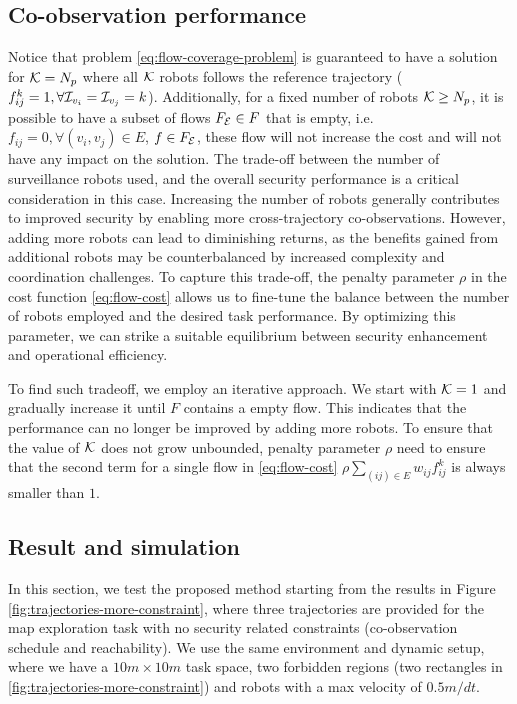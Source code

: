 \documentclass[journal]{IEEEtran}  %
\begin{document}
\subsection{Co-observation performance}
Notice that problem \eqref{eq:flow-coverage-problem} is guaranteed to have a solution for $\mathcal{K}=N_{p}$ where all $\mathcal{K}$ robots follows the reference trajectory ($f^{k}_{ij}=1, \forall \mathcal{I}_{v_{i}}=\mathcal{I}_{v_{j}}=k$).  Additionally, for a fixed number of robots $\mathcal{K} \geq N_{p}$, it is possible to have a subset of flows $F_{\mathcal{E}} \in F$ that is empty, i.e. $f_{ij}=0, \forall (v_{i},v_{j})\in E$, $f\in F_{\mathcal{E}}$, these flow will not increase the cost and will not have any impact on the solution.  
The trade-off between the number of surveillance robots used, and the overall security performance is a critical consideration in this case. Increasing the number of robots generally contributes to improved security by enabling more cross-trajectory co-observations. However, adding more robots can lead to diminishing returns, as the benefits gained from additional robots may be counterbalanced by increased complexity and coordination challenges. To capture this trade-off, the penalty parameter $\rho$ in the cost function \ref{eq:flow-cost} allows us to fine-tune the balance between the number of robots employed and the desired task performance. By optimizing this parameter, we can strike a suitable equilibrium between security enhancement and operational efficiency.

To find such tradeoff, we employ an iterative approach. We start with $\mathcal{K}=1$ and gradually increase it until $F$ contains a empty flow. This indicates that the performance can no longer be improved by adding more robots. To ensure that the value of $\mathcal{K}$ does not grow unbounded, penalty parameter $\rho$ need to ensure that the second term for a single flow in \eqref{eq:flow-cost} $ \rho \sum_{(ij)\in E} w_{ij} f^k_{ij}$ is always smaller than $1$.

\subsection{Result and simulation}
In this section, we test the proposed method starting from the results in Figure \ref{fig:trajectories-more-constraint}, where three trajectories are provided for the map exploration task with no security related constraints (co-observation schedule and reachability). We use the same environment and dynamic setup, where we have a $10m\times10m$ task space, two forbidden regions (two rectangles in  \ref{fig:trajectories-more-constraint}) and robots with a max velocity of $0.5m/dt$.
\end{document}

